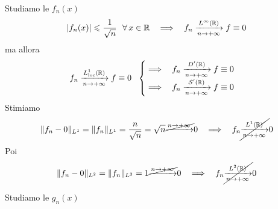 Studiamo le $f_{n}( x)$
\begin{equation*}
| f_{n}( x)| \leqslant \frac{1}{\sqrt{n}} \ \ \forall x\in \RR  \ \ \implies \ \ f_{n}\xrightarrow[n\rightarrow +\infty ]{L^{\infty }(\RR )} f\equiv 0
\end{equation*}
ma allora
\begin{equation*}
f_{n}\xrightarrow[n\rightarrow +\infty ]{L^{1}_{\mathrm{loc}}(\mathbb{R} )} f\equiv 0\ \ \begin{cases}
\implies \ \ f_{n}\xrightarrow[n\rightarrow +\infty ]{D'(\mathbb{R} )} f\equiv 0\\
\implies \ \ f_{n}\xrightarrow[n\rightarrow +\infty ]{\mathcal{S}  '(\mathbb{R} )} f\equiv 0
\end{cases}
\end{equation*}
Stimiamo
\begin{equation*}
\Vert f_{n} -0\Vert _{L^{1}} =\Vert f_{n}\Vert _{L^{1}} =\frac{n}{\sqrt{n}} =\sqrt{n}\cancel{\xrightarrow{n\rightarrow +\infty }} 0\ \ \implies \ \ f_{n}\cancel{\xrightarrow[n\rightarrow +\infty ]{L^{1}(\RR )}} 0
\end{equation*}
Poi
\begin{equation*}
\Vert f_{n} -0\Vert _{L^{2}} =\Vert f_{n}\Vert _{L^{2}} =1\cancel{\xrightarrow{n\rightarrow +\infty }} 0\ \ \implies \ \ f_{n}\cancel{\xrightarrow[n\rightarrow +\infty ]{L^{2}(\mathbb{R} )}} 0
\end{equation*}


Studiamo le $g_{n}( x)$

